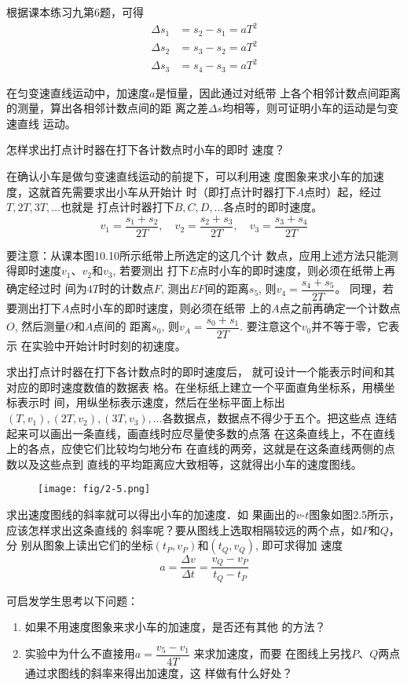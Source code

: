 根据课本练习九第6题，可得
\[\begin{split}
    \Delta s_1&=s_2-s_1=aT^2\\
    \Delta s_2&=s_3-s_2=aT^2\\
    \Delta s_3&=s_4-s_3=aT^2
\end{split}\]

在匀变速直线运动中，加速度$a$是恒量，因此通过对纸带
上各个相邻计数点间距离的测量，算出各相邻计数点间的距
离之差$\Delta s$均相等，则可证明小车的运动是匀变速直线
运动。

怎样求出打点计时器在打下各计数点时小车的即时
速度？

在确认小车是做匀变速直线运动的前提下，可以利用速
度图象来求小车的加速度，这就首先需要求出小车从开始计
时（即打点计时器打下$A$点时）起，经过$T,2T,3T,\ldots$也就是
打点计时器打下$B,C,D,\ldots$各点时的即时速度。
\[v_1=\frac{s_1+s_2}{2T},\quad v_2=\frac{s_2+s_3}{2T},\quad v_3=\frac{s_3+s_4}{2T}\]

要注意：从课本图10.10所示纸带上所选定的这几个计
数点，应用上述方法只能测得即时速度$v_1$、$v_2$和$v_3$, 若要测出
打下$E$点时小车的即时速度，则必须在纸带上再确定经过时
间为$4T$时的计数点$F$, 测出$EF$间的距离$s_5$, 则$v_4=\dfrac{s_4+s_5}{2T}$。
同理，若要测出打下$A$点时小车的即时速度，则必须在纸带
上的$A$点之前再确定一个计数点$O$, 然后测量$O$和$A$点间的
距离$s_0$, 则$v_A=\dfrac{s_0+s_1}{2T}$.
要注意这个$v_0$并不等于零，它表示
在实验中开始计时时刻的初速度。

求出打点计时器在打下各计数点时的即时速度后，
就可设计一个能表示时间和其对应的即时速度数值的数据表
格。在坐标纸上建立一个平面直角坐标系，用横坐标表示时
间，用纵坐标表示速度，然后在坐标平面上标出$(T,v_1),(2T,
v_2),(3T,v_3),\ldots$各数据点，数据点不得少于五个。把这些点
连结起来可以画出一条直线，画直线时应尽量使多数的点落
在这条直线上，不在直线上的各点，应使它们比较均匀地分布
在直线的两旁，这就是在这条直线两侧的点数以及这些点到
直线的平均距离应大致相等，这就得出小车的速度图线。

\begin{figure}[htp]
    \centering
    \texttt{[image: fig/2-5.png]}
    \caption{}
\end{figure}

求出速度图线的斜率就可以得出小车的加速度．如
果画出的$v$-$t$图象如图2.5所示，应该怎样求出这条直线的
斜率呢？要从图线上选取相隔较远的两个点，如$P$和$Q$，分
别从图象上读出它们的坐标$(t_P,v_P)$和$(t_Q,v_Q)$, 即可求得加
速度
\[a=\frac{\Delta v}{\Delta t}=\frac{v_Q-v_P}{t_Q-t_P}\]

可启发学生思考以下问题：
\begin{enumerate}
    \item 如果不用速度图象来求小车的加速度，是否还有其他
的方法？
\item 实验中为什么不直接用$a=\dfrac{v_5-v_1}{4T}$
来求加速度，而要
在图线上另找$P$、$Q$两点通过求图线的斜率来得出加速度，这
样做有什么好处？
\end{enumerate}

